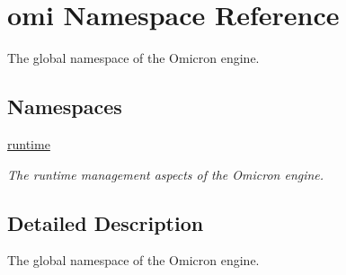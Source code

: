 \hypertarget{namespaceomi}{}\section{omi Namespace Reference}
\label{namespaceomi}


The global namespace of the Omicron engine.  


\subsection*{Namespaces}
\begin{DoxyCompactItemize}
\item 
 \hyperlink{namespaceomi_1_1runtime}{runtime}
\begin{DoxyCompactList}\small\item\em The runtime management aspects of the Omicron engine. \end{DoxyCompactList}\end{DoxyCompactItemize}


\subsection{Detailed Description}
The global namespace of the Omicron engine. 